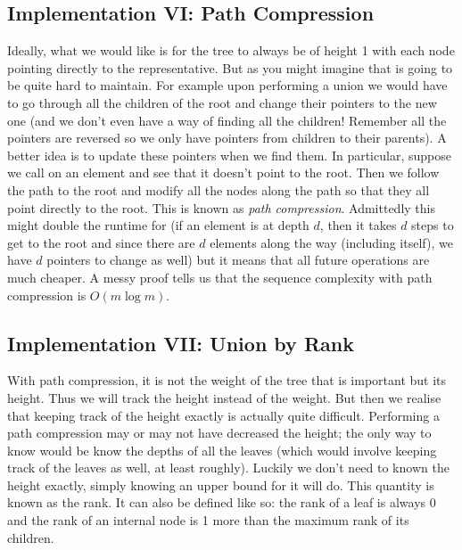 \subsection{Implementation VI: Path Compression}
Ideally, what we would like is for the tree to always be of height 1 with each node pointing directly to the representative. But as you might imagine that is going to be quite hard to maintain. For example upon performing a union we would have to go through all the children of the root and change their pointers to the new one (and we don't even have a way of finding all the children! Remember all the pointers are reversed so we only have pointers from children to their parents). A better idea is to update these pointers when we find them. In particular, suppose we call  on an element and see that it doesn't point to the root. Then we follow the path to the root and modify all the nodes along the path so that they all point directly to the root. This is known as \textit{path compression}. Admittedly this might double the runtime for  (if an element is at depth $d$, then it takes $d$ steps to get to the root and since there are $d$ elements along the way (including itself), we have $d$ pointers to change as well) but it means that all future operations are much cheaper. A messy proof tells us that the sequence complexity with path compression is $O(m \log m)$. 


\subsection{Implementation VII: Union by Rank}
With path compression, it is not the weight of the tree that is important but its height. Thus we will track the height instead of the weight. But then we realise that keeping track of the height exactly is actually quite difficult. Performing a path compression may or may not have decreased the height; the only way to know would be know the depths of all the leaves (which would involve keeping track of the leaves as well, at least roughly). Luckily we don't need to known the height exactly, simply knowing an upper bound for it will do. This quantity is known as the rank. It can also be defined like so: the rank of a leaf is always 0 and the rank of an internal node is 1 more than the maximum rank of its children.

